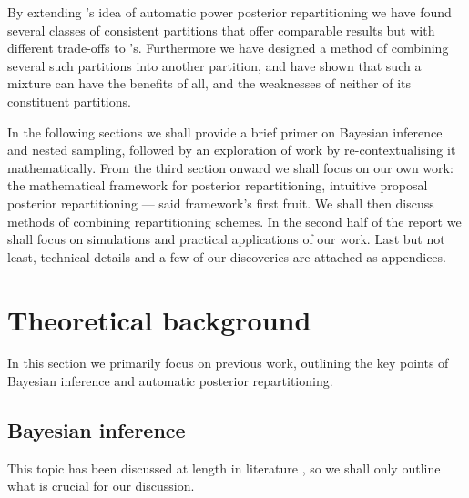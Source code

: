 \documentclass[usenatbib]{mnras}
\begin{document}
By extending \cite{chen-ferroz-hobson}'s idea of automatic power
posterior repartitioning we have found several classes of consistent
partitions that offer comparable results but with different trade-offs
to \cite{chen-ferroz-hobson}'s. Furthermore we have designed a method
of combining several such partitions into another partition, and have
shown that such a mixture can have the benefits of all, and the
weaknesses of neither of its constituent partitions.

In the following sections we shall provide a brief primer on Bayesian
inference and nested sampling, followed by an exploration of work by
\cite{chen-ferroz-hobson} re-contextualising it mathematically. From
the third section onward we shall focus on our own work: the
mathematical framework for posterior repartitioning, intuitive
proposal posterior repartitioning --- said framework's first fruit. We
shall then discuss methods of combining repartitioning schemes. In the
second half of the report we shall focus on simulations and practical
applications of our work. Last but not least, technical details and a
few of our discoveries are attached as appendices.



\section{Theoretical background}\label{sec:orge6061a4}
In this section we primarily focus on previous work, outlining the key
points of Bayesian inference and automatic posterior repartitioning.
\subsection{Bayesian inference}\label{sec:primer}

This topic has been discussed at length in literature
\citep{jeffreys2010scientific}, so we shall only outline what is
crucial for our discussion.
\end{document}
